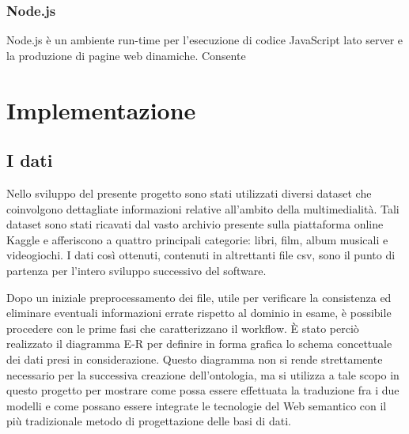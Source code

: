 \documentclass[Lau,binding=0.6cm,noexaminfo,oneside]{sapthesis}
\begin{document}
\subsection{Node.js}

Node.js è un ambiente run-time per l'esecuzione di codice JavaScript lato server e la produzione di pagine web dinamiche. Consente

\chapter{Implementazione}
\section{I dati}

Nello sviluppo del presente progetto sono stati utilizzati diversi dataset che coinvolgono dettagliate informazioni relative all'ambito della multimedialità. Tali dataset sono stati ricavati dal vasto archivio presente sulla piattaforma online Kaggle e afferiscono a quattro principali categorie: libri, film, album musicali e videogiochi. I dati così ottenuti, contenuti in altrettanti file csv, sono il punto di partenza per l'intero sviluppo successivo del software.\medskip

Dopo un iniziale preprocessamento dei file, utile per verificare la consistenza ed eliminare eventuali informazioni errate rispetto al dominio in esame, è possibile procedere con le prime fasi che caratterizzano il workflow. \MakeUppercase{è} stato perciò realizzato il diagramma E-R per definire in forma grafica lo schema concettuale dei dati presi in considerazione. Questo diagramma non si rende strettamente necessario per la successiva creazione dell'ontologia, ma si utilizza a tale scopo in questo progetto per mostrare come possa essere effettuata la traduzione fra i due modelli e come possano essere integrate le tecnologie del Web semantico con il più tradizionale metodo di progettazione delle basi di dati.\medskip
\end{document}
